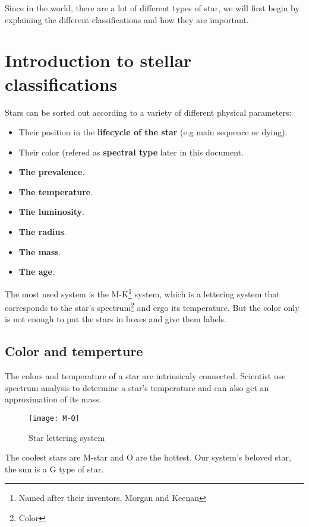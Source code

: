 \documentclass[a4paper, 11pt]{article} %
\begin{document}
Since in the world, there are a lot of different types of star, we will first begin by explaining the different classifications and how they are important.

\section{Introduction to stellar classifications}



Stars can be sorted out according to a variety of different physical parameters:

\begin{itemize}
\item Their position in the \textbf{lifecycle of the star} (e.g main sequence or dying).
\item Their color (refered as \textbf{spectral type} later in this document.
\item \textbf{The prevalence}.
\item \textbf{The temperature}. 
\item \textbf{The luminosity}.
\item \textbf{The radius}.
\item \textbf{The mass}.
\item \textbf{The age}.
\end{itemize}

The most used system is the M-K\footnote{Named after their inventors, Morgan and Keenan} system, which is a lettering system that corresponds to the star's spectrum\footnote{Color} and ergo its temperature. But the color only is not enough to put the stars in boxes and give them labels.  

\subsection{Color and temperture}

The colors and temperature of a star are intrinsicaly connected. Scientist use spectrum analysis to determine a star's temperature and can also get an approximation of its mass.



\begin{figure}[h]
\centering
\texttt{[image: M-O]}
\caption{Star lettering system}
\end{figure}

The coolest stars are M-star and O are the hottest. Our system's beloved star, the sun is a G type of star.
\end{document}
